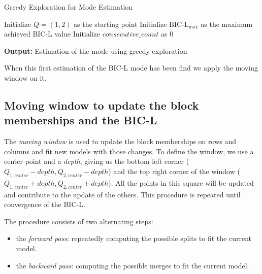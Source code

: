 \documentclass[12pt,a4paper]{report}
\begin{document}
\begin{algorithm}[H]
    \caption{Greedy Exploration for Mode Estimation}
    \SetAlgoLined
    
    
    \BlankLine
    Initialize $Q = (1,2)$ as the starting point
    Initialize $\text{BIC-L}_{\text{max}}$ as the maximum achieved BIC-L value
    Initialize $consecutive\_count$ as 0
    
    \BlankLine
    
    \BlankLine
    \textbf{Output:} Estimation of the mode using greedy exploration
\end{algorithm}

When this first estimation of the BIC-L mode has been find we apply the moving
window on it.
\subsection{Moving window to update the block memberships and the BIC-L}
The \emph{moving window} is used to update the block memberships on rows and 
columns and fit new models with those changes.
To define the window, we use a center point and a \emph{depth}, giving us the 
bottom left corner ($Q_{1,center} - depth, Q_{2,center} - depth$) and the top right corner of the 
window ($Q_{1,center} + depth, Q_{2,center} + depth$). All the points in this square will be 
updated and contribute to the update of the others.
This procedure is repeated until convergence of the BIC-L.

The procedure consists of two alternating steps:
\begin{itemize}
    \item the \emph{forward pass}: repeatedly computing the possible splits to 
    fit the current model.
    \item the \emph{backward pass}: computing the possible merges to fit the current model.
\end{itemize}
\end{document}
